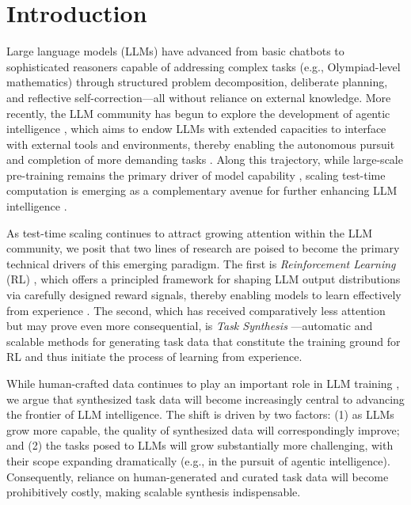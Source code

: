 
\section{Introduction}
Large language models (LLMs) have advanced from basic chatbots \citep{ouyang2022training,achiam2023gpt,hurst2024gpt4o} to sophisticated reasoners \citep{jaech2024openai,guo2025deepseekr1} capable of addressing complex tasks (e.g., Olympiad-level mathematics) through structured problem decomposition, deliberate planning, and reflective self-correction—all without reliance on external knowledge. More recently, the LLM community has begun to explore the development of agentic intelligence \citep{moonshot2025kimik2,zeng2025glm}, which aims to endow LLMs with extended capacities to interface with external tools and environments, 
thereby enabling the autonomous pursuit and completion of more demanding tasks \citep{phan2025humanity}. Along this trajectory, while large-scale pre-training remains the primary driver of model capability \citep{gandhi2025cognitive}, scaling test-time computation is emerging as a complementary avenue for further enhancing LLM intelligence \citep{snell2024scaling}.


As test-time scaling continues to attract growing attention within the LLM community, we posit that two lines of research are poised to become the primary technical drivers of this emerging paradigm. The first is \textit{Reinforcement Learning} (RL) \citep{guo2025deepseekr1,schulman2017proximal}, which offers a principled framework for shaping LLM output distributions via carefully designed reward signals, thereby enabling models to learn effectively from experience \citep{silver2025welcome}. The second, which has received comparatively less attention but may prove even more consequential, is \textit{Task Synthesis} \citep{yang2025swe,li2025websailor,zhao2025promptcot,liu2025webexplorer}—automatic and scalable methods for generating task data that constitute the training ground for RL and thus initiate the process of learning from experience.

\newpage
While human-crafted data continues to play an important role in LLM training \citep{moshkov2025aimo,ahmad2025opencodereasoning}, we argue that synthesized task data will become increasingly central to advancing the frontier of LLM intelligence. The shift is driven by two factors: (1) as LLMs grow more capable, the quality of synthesized data will correspondingly improve; and (2) the tasks posed to LLMs will grow substantially more challenging, with their scope expanding dramatically (e.g., in the pursuit of agentic intelligence). Consequently, reliance on human-generated and curated task data will become prohibitively costly, making scalable synthesis indispensable.

